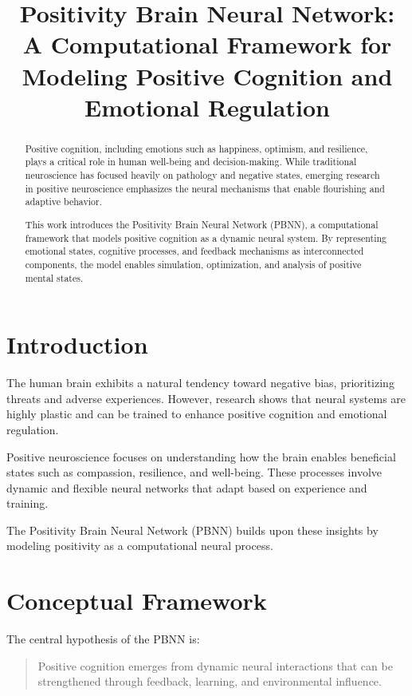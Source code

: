 \documentclass[12pt]{article}
\title{\textbf{Positivity Brain Neural Network: \\ A Computational Framework for Modeling Positive Cognition and Emotional Regulation}}
\author{}
\date{}
\begin{document}
\maketitle

\begin{abstract}
Positive cognition, including emotions such as happiness, optimism, and resilience, plays a critical role in human well-being and decision-making. While traditional neuroscience has focused heavily on pathology and negative states, emerging research in positive neuroscience emphasizes the neural mechanisms that enable flourishing and adaptive behavior.

This work introduces the Positivity Brain Neural Network (PBNN), a computational framework that models positive cognition as a dynamic neural system. By representing emotional states, cognitive processes, and feedback mechanisms as interconnected components, the model enables simulation, optimization, and analysis of positive mental states.
\end{abstract}

\section{Introduction}

The human brain exhibits a natural tendency toward negative bias, prioritizing threats and adverse experiences. However, research shows that neural systems are highly plastic and can be trained to enhance positive cognition and emotional regulation.

Positive neuroscience focuses on understanding how the brain enables beneficial states such as compassion, resilience, and well-being. These processes involve dynamic and flexible neural networks that adapt based on experience and training.

The Positivity Brain Neural Network (PBNN) builds upon these insights by modeling positivity as a computational neural process.

\section{Conceptual Framework}

The central hypothesis of the PBNN is:

\begin{quote}
Positive cognition emerges from dynamic neural interactions that can be strengthened through feedback, learning, and environmental influence.
\end{quote}
\end{document}
